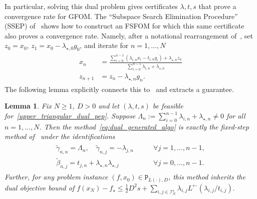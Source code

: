 \documentclass[11pt, hidelinks]{article}
\numberwithin{equation}{section}
\theoremstyle{thmstyletwo}%
\newtheorem{lemma}[thm]{Lemma}
\numberwithin{equation}{section}
\newcommand{\Lleft}{L^{\leftarrow}}
\begin{document}
In particular, solving this dual problem gives certificates $\lambda, t, s$ that prove a convergence rate for GFOM. The ``Subspace Search Elimination Procedure'' (SSEP) of~\cite{constructive_approach} shows how to construct an FSFOM for which this same certificate also proves a convergence rate. Namely, after a notational
rearrangement of~\cite[Corollary 1]{constructive_approach}, set $z_0=x_0$, $z_1 = x_0 - \lambda_{\star,0}g_0$, and iterate for $n=1,\dots,N$
\begin{align}\label{eq:dual_generated_algo}
    \begin{split}
    x_n &= \frac{\sum_{i=0}^{n-1} \left(\lambda_{i,n} x_i - t_{i,n} g_i\right) + \lambda_{\star,n} z_n}{\sum_{i=0}^{n-1} \lambda_{i,n} + \lambda_{\star,n}}\\
    z_{n+1} &= z_n-\lambda_{\star,n}g_n.
    \end{split}
\end{align} 
The following lemma explicitly connects this to~\cite{constructive_approach} and extracts a guarantee.



\begin{lemma}\label{lem:equivalence}
Fix $N \geq 1$, $D > 0$ and let $(\lambda, t, s)$ be feasible
for~\eqref{upper_triangular_dual_pep}. Suppose $\Lambda_n := \sum_{i=0}^{n-1} \lambda_{i,n} + \lambda_{\star,n} \ne 0$ for all $n = 1,\dots,N$.
Then the method~\eqref{eq:dual_generated_algo} is exactly the fixed-step method
of~\cite[Corollary~1]{constructive_approach} under the identifications
\begin{align}\label{eq:dual-dictionary}
\begin{split}
    \tilde\gamma_{n,n} = \Lambda_n, \quad
    \tilde\gamma_{n,j} = -\lambda_{j,n} \qquad &\forall j = 1, \dots, n-1,\\
    \tilde\beta_{n,j}  = t_{j,n} + \lambda_{\star,n}\lambda_{\star,j} \qquad &\forall j = 0, \dots, n-1.
\end{split}
\end{align}
Further, for any problem instance $(f, x_0) \in \mathtt{P}_{L(\cdot),D}$, this method inherits the dual objective bound of 
$f(x_N) - f_\star \leq \frac{1}{2}D^2s + \sum_{i,j \in \mathcal{I}_N^\star} \lambda_{i,j}\Lleft(\lambda_{i,j}/t_{i,j}).$
\end{lemma}
\end{document}
